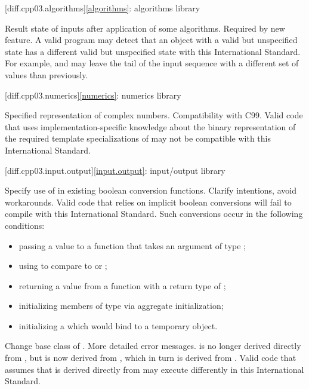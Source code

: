 [diff.cpp03.algorithms]{\ref{algorithms}: algorithms library}

\change
Result state of inputs after application of some algorithms.
\rationale
Required by new feature.
\effect
A valid \CppIII{} program may detect that an object with a valid but
unspecified state has a different valid but unspecified state with this
International Standard. For example,  and
 may leave the tail of the input sequence with a
different set of values than previously.

[diff.cpp03.numerics]{\ref{numerics}: numerics library}

\change
Specified representation of complex numbers.
\rationale
Compatibility with C99.
\effect
Valid \CppIII{} code that uses implementation-specific knowledge about the
binary representation of the required template specializations of
 may not be compatible with this International Standard.

[diff.cpp03.input.output]{\ref{input.output}: input/output library}

\change
Specify use of  in existing boolean conversion functions.
\rationale
Clarify intentions, avoid workarounds.
\effect
Valid \CppIII{} code that relies on implicit boolean conversions will fail to
compile with this International Standard. Such conversions occur in the
following conditions:

\begin{itemize}
\item passing a value to a function that takes an argument of type ;
\item using  to compare to  or ;
\item returning a value from a function with a return type of ;
\item initializing members of type  via aggregate initialization;
\item initializing a  which would bind to a temporary object.
\end{itemize}

\change
Change base class of .
\rationale
More detailed error messages.
\effect
{} is no longer derived directly from
, but is now derived from ,
which in turn is derived from . Valid \CppIII{} code
that assumes that  is derived directly from
 may execute differently in this International Standard.


